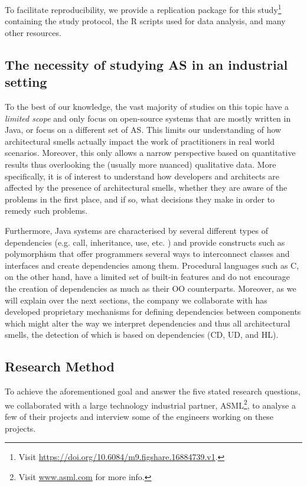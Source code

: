 To facilitate reproducibility, we provide a replication package for this study\footnote{Visit \url{https://doi.org/10.6084/m9.figshare.16884739.v1}.} 
containing the study protocol, the R scripts used for data analysis, and many other resources.

\subsection{The necessity of studying AS in an industrial setting}
To the best of our knowledge, the vast majority of studies on this topic have a \emph{limited scope} and only focus on open-source systems that are mostly written in Java, or focus on a different set of AS.
This limits our understanding of how architectural smells actually impact the work of practitioners in real world scenarios.
Moreover, this only allows a narrow perspective based on quantitative results thus overlooking the (usually more nuanced) qualitative data. 
More specifically, it is of interest to understand how developers and architects are affected by the presence of architectural smells, whether they are aware of the problems in the first place, and if so, what decisions they make in order to remedy such problems.

Furthermore, Java systems are characterised by several different types of dependencies (e.g. call, inheritance, use, etc. \cite{Pruijt2017}) and provide constructs such as polymorphism that offer programmers several ways to interconnect classes and interfaces and create dependencies among them.
Procedural languages such as C, on the other hand, have a limited set of built-in features and do not encourage the creation of dependencies as much as their OO counterparts.
Moreover, as we will explain over the next sections, the company we collaborate with has developed proprietary mechanisms for defining dependencies between components which might alter the way we interpret dependencies and thus all architectural smells, the detection of which is based on dependencies (CD, UD, and HL).

\subsection{Research Method}
To achieve the aforementioned goal and answer the five stated research questions, we collaborated with a large technology industrial partner, ASML\footnote{Visit \url{www.asml.com} for more info.}, to analyse a few of their projects and interview some of the engineers working on these projects. 

